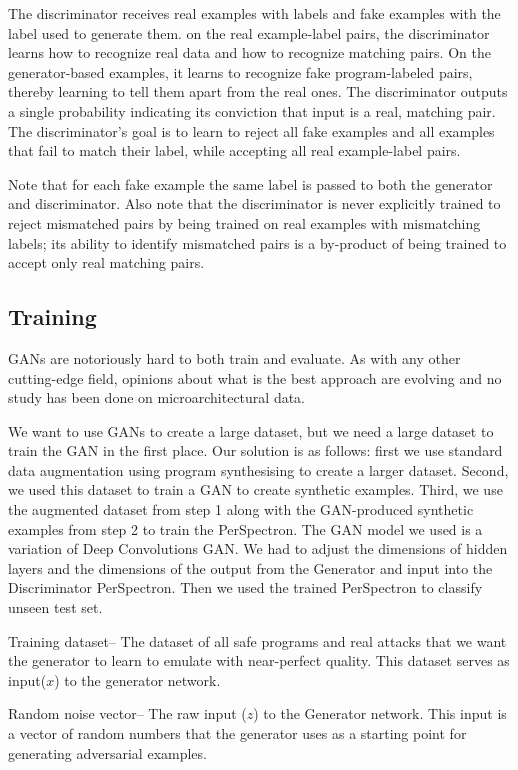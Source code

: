  
 
 The discriminator receives real examples with labels and fake examples with the label used to generate them. on the real example-label pairs, the discriminator learns how to recognize real data and how to recognize matching pairs. On the generator-based examples, it learns to recognize fake program-labeled pairs, thereby learning to tell them apart from the real ones. The discriminator outputs a single probability indicating its conviction that input is a real, matching pair. The discriminator's goal is to learn to reject all fake examples and all examples that fail to match their label, while accepting all real example-label pairs. 
 
 Note that for each fake example the same label is passed to both the generator and discriminator. Also note that the discriminator is never explicitly trained to reject mismatched pairs by being trained on real examples with mismatching labels; its ability to identify mismatched pairs is a by-product of being trained to accept only real matching pairs. 
 

\subsection{Training}
GANs are notoriously hard to both train and evaluate. As with any other cutting-edge field, opinions about what is the best approach are evolving and no study has been done on microarchitectural data. 

We want to use GANs to create a large dataset, but we need a large dataset to train the GAN in the first place. 
Our solution is as follows:
first we use standard data augmentation using program synthesising to create a larger dataset. Second, we used this dataset to train a GAN to create synthetic examples. Third, we use the augmented dataset from step 1 along with the GAN-produced synthetic examples from step 2 to train the PerSpectron. The GAN model we used is a variation of Deep Convolutions GAN. We had to adjust the dimensions of hidden layers and the dimensions of the output from the Generator and input into the Discriminator PerSpectron. Then we used the trained PerSpectron to classify unseen test set.  

Training dataset-- The dataset of all safe programs and real attacks that we want the generator to learn to emulate with near-perfect quality. This dataset serves as input($x$) to the generator network. 

Random noise vector-- The raw input ($z$) to the Generator network. This input is a vector of random numbers that the generator uses as a starting point for generating adversarial examples. 

